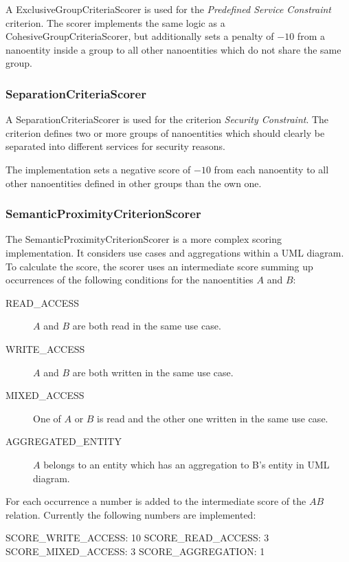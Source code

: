 A ExclusiveGroupCriteriaScorer is used for the \textit{Predefined Service Constraint} criterion. The scorer implements the same logic as a CohesiveGroupCriteriaScorer, but additionally sets a penalty of $-10$ from a nanoentity inside a group to all other nanoentities which do not share the same group.

\subsubsection{SeparationCriteriaScorer}

A SeparationCriteriaScorer is used for the criterion \textit{Security Constraint}. The criterion defines two or more groups of nanoentities which should clearly be separated into different services for security reasons. 

The implementation sets a negative score of $-10$ from each nanoentity to all other nanoentities defined in other groups than the own one. 

\subsubsection{SemanticProximityCriterionScorer}

The SemanticProximityCriterionScorer is a more complex scoring implementation. It considers use cases and aggregations within a UML diagram. To calculate the score, the scorer uses an intermediate score summing up occurrences of the following conditions for the nanoentities $A$ and $B$:

\begin{description}
	\item [READ\_ACCESS] $A$ and $B$ are both read in the same use case.
	\item [WRITE\_ACCESS] $A$ and $B$ are both written in the same use case.
	\item [MIXED\_ACCESS] One of $A$ or $B$ is read and the other one written in the same use case.
	\item [AGGREGATED\_ENTITY] $A$ belongs to an entity which has an aggregation to B's entity in UML diagram. 
\end{description}

For each occurrence a number is added to the intermediate score of the $AB$ relation. Currently the following numbers are implemented:

SCORE\_WRITE\_ACCESS: 10 \newline
SCORE\_READ\_ACCESS: 3  \newline
SCORE\_MIXED\_ACCESS: 3 \newline 
SCORE\_AGGREGATION: 1 \newline 

